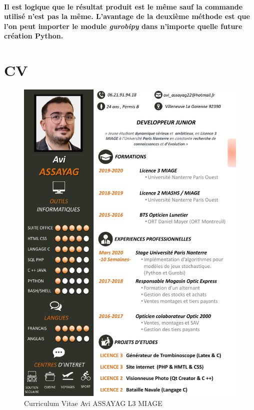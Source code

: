 \documentclass[a4paper, 12pt, twoside]{article}
\begin{document}
\paragraph{Il est logique que le résultat produit est le même sauf la commande utilisé n'est pas la même. L'avantage de la deuxième méthode est que l'on peut importer le module \textit{gurobipy} dans n'importe quelle future création Python.}
\newpage
\section{ CV}
\begin{center}
\begin{figure}[h!]
\centering
\includegraphics [scale=0.83]{CV.pdf}
\caption{Curriculum Vitae Avi ASSAYAG L3 MIAGE}
\end{figure}
\end{center}
\newpage
\listoffigures\
\end{document}
